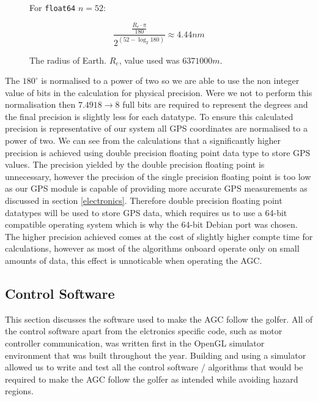 \documentclass[11pt,landscape]{article}
\begin{document}
\begin{multicols}{3}
\begin{figure}[H]
\begin{mdframed}
\begin{center}
                \begin{minipage}{0.45\textwidth}
                    \begin{mdframed}
                For \verb|float64| $n=52$:
                \begin{center}
                    \begin{equation*}
                        \frac{\frac{R_e \cdot \pi}{180}}{2^{\left(52 - \log_2{180}\right)}} \approx 4.44nm
                    \end{equation*}
                \end{center}
            \end{mdframed}
            \end{minipage}
        \end{center}
        \center The radius of Earth. $R_e$, value used was $6371000m$. 
    \end{mdframed} 
    \label{fig:float_calcs}
\end{figure}
The $180^{\circ}$ is normalised to a power of two so we are able to use the non
integer value of bits in the calculation for physical precision. Were we not to
perform this normalisation then $7.4918\rightarrow8$ full bits are required to
represent the degrees and the final precision is slightly less for each
datatype. To ensure this calculated precision is representative of our system
all GPS coordinates are normalised to a power of two. We can see from the
calculations that a significantly higher precision is achieved using double
precision floating point data type to store GPS values. The precision yielded by
the double precision floating point is unnecessary, however the precision of the
single precision floating point is too low as our GPS module is capable of
providing more accurate GPS measurements as discussed in section
\ref{electronics}. Therefore double precision floating point datatypes will be
used to store GPS data, which requires us to use a 64-bit compatible operating
system which is why the 64-bit Debian port was chosen. The higher precision
achieved comes at the cost of slightly higher compte time for calculations,
however as most of the algorithms onboard operate only on small amounts of data,
this effect is unnoticable when operating the AGC.

\subsection{Control Software}
\label{control_software}
This section discusses the software used to make the AGC follow the golfer. All
of the control software apart from the elctronics specific code, such as motor
controller communication, was written first in the OpenGL simulator environment that was
built throughout the year. Building and using a simulator allowed us to write
and test all the control software / algorithms that would be required to make
the AGC follow the golfer as intended while avoiding hazard regions.


\end{multicols}
\end{document}
